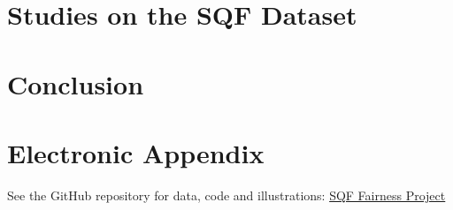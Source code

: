 \documentclass[12pt]{article}
\begin{document}
\section{Studies on the SQF Dataset}
\label{sec:studies}

% 

\section{Conclusion}

\newpage

% 

% 
\newpage



\listoffigures
% 


\listoftables
% 


    

\setcounter{page}{5} %

\appendix

% 

\section{Electronic Appendix}
\label{el_app}
See the GitHub repository for data, code and illustrations:
\href{https://github.com/juliet-fleischer/SQF_fairness_project}{SQF Fairness Project}
\newpage
\end{document}
